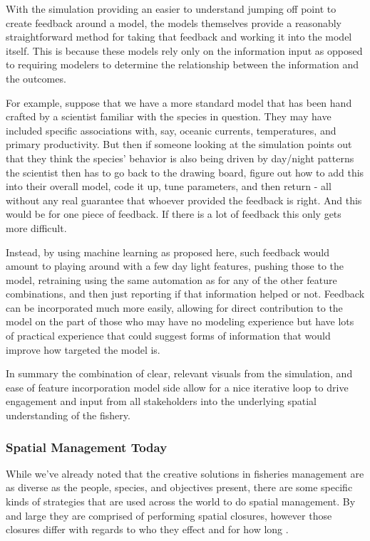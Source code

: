 \documentclass[11pt]{article}
\begin{document}
With the simulation providing an easier to understand jumping off point to create feedback around a model, the models themselves provide a reasonably straightforward method for taking that feedback and working it into the model itself. This is because these models rely only on the information input as opposed to requiring modelers to determine the relationship between the information and the outcomes. 

For example, suppose that we have a more standard model that has been hand crafted by a scientist familiar with the species in question. They may have included specific associations with, say, oceanic currents, temperatures, and primary productivity. But then if someone looking at the simulation points out that they think the species' behavior is also being driven by day/night patterns the scientist then has to go back to the drawing board, figure out how to add this into their overall model, code it up, tune parameters, and then return - all without any real guarantee that whoever provided the feedback is right. And this would be for one piece of feedback. If there is a lot of feedback this only gets more difficult. 

Instead, by using machine learning as proposed here, such feedback would amount to playing around with a few day light features, pushing those to the model, retraining using the same automation as for any of the other feature combinations, and then just reporting if that information helped or not. Feedback can be incorporated much more easily, allowing for direct contribution to the model on the part of those who may have no modeling experience but have lots of practical experience that could suggest forms of information that would improve how targeted the model is.
\newline

In summary the combination of clear, relevant visuals from the simulation, and ease of feature incorporation model side allow for a nice iterative loop to drive engagement and input from all stakeholders into the underlying spatial understanding of the fishery.  

\subsubsection{Spatial Management Today} 

While we've already noted that the creative solutions in fisheries management are as diverse as the people, species, and objectives present, there are some specific kinds of strategies that are used across the world to do spatial management. By and large they are comprised of performing spatial closures, however those closures differ with regards to who they effect and for how long \citep{selig2016} \citep{little2014}. \newline
\end{document}
